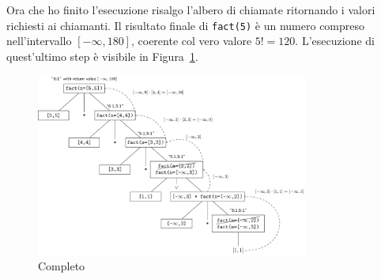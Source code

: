 Ora che ho finito l'esecuzione risalgo l'albero di chiamate ritornando i valori richiesti ai chiamanti. Il risultato finale di \texttt{fact(5)} è un numero compreso nell'intervallo $[-\infty,180]$, coerente col vero valore $5!=120$. L'esecuzione di quest'ultimo step è visibile in Figura~\ref{fig:realizzazione:fun-hierarchy-4}.

\begin{figure}[htbp]
    \centering
    \includegraphics[width=0.8\textwidth]{scheme-generator/generated/example-fun-rec-hierarchy-4.pdf}
    \caption{Completo}
    \label{fig:realizzazione:fun-hierarchy-4}
\end{figure}
